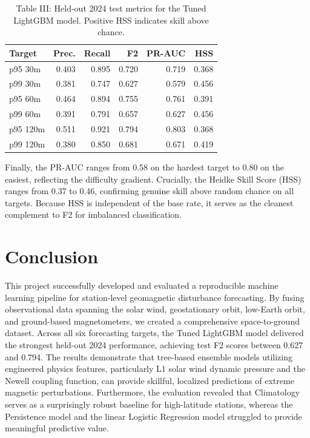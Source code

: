 \documentclass[conference]{IEEEtran}
\begin{document}
\begin{table}[htbp]
\caption{Table III: Held-out 2024 test metrics for the Tuned LightGBM model. Positive HSS indicates skill above chance.}
\centering
\begin{tabular}{lrrrrr}
\toprule
Target & Prec. & Recall & F2 & PR-AUC & HSS \\
\midrule
p95 30m & 0.403 & 0.895 & 0.720 & 0.719 & 0.368 \\
p99 30m & 0.381 & 0.747 & 0.627 & 0.579 & 0.456 \\
p95 60m & 0.464 & 0.894 & 0.755 & 0.761 & 0.391 \\
p99 60m & 0.391 & 0.791 & 0.657 & 0.627 & 0.456 \\
p95 120m & 0.511 & 0.921 & 0.794 & 0.803 & 0.368 \\
p99 120m & 0.380 & 0.850 & 0.681 & 0.671 & 0.419 \\
\bottomrule
\end{tabular}
\end{table}

Finally, the PR-AUC ranges from 0.58 on the hardest target to 0.80 on the easiest, reflecting the difficulty gradient. Crucially, the Heidke Skill Score (HSS) ranges from 0.37 to 0.46, confirming genuine skill above random chance on all targets. Because HSS is independent of the base rate, it serves as the cleanest complement to F2 for imbalanced classification.

\section{Conclusion}

This project successfully developed and evaluated a reproducible machine learning pipeline for station-level geomagnetic disturbance forecasting. By fusing observational data spanning the solar wind, geostationary orbit, low-Earth orbit, and ground-based magnetometers, we created a comprehensive space-to-ground dataset. Across all six forecasting targets, the Tuned LightGBM model delivered the strongest held-out 2024 performance, achieving test F2 scores between 0.627 and 0.794. The results demonstrate that tree-based ensemble models utilizing engineered physics features, particularly L1 solar wind dynamic pressure and the Newell coupling function, can provide skillful, localized predictions of extreme magnetic perturbations. Furthermore, the evaluation revealed that Climatology serves as a surprisingly robust baseline for high-latitude stations, whereas the Persistence model and the linear Logistic Regression model struggled to provide meaningful predictive value.
\end{document}
